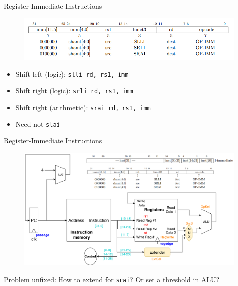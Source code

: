 \documentclass[UTF8]{ctexbeamer}
\begin{document}
\begin{frame}[fragile]{Register-Immediate Instructions}
\begin{figure}
\centering
\includegraphics[width=\linewidth]{fig/Lecture2/r-i_2.PNG}
\end{figure}
\begin{itemize}
	\item Shift left (logic): \verb'slli rd, rs1, imm'
	\item Shift right (logic): \verb'srli rd, rs1, imm'
	\item Shift right (arithmetic): \verb'srai rd, rs1, imm'
	\item Need not \verb'slai'
\end{itemize}
\end{frame}

\begin{frame}[fragile]{Register-Immediate Instructions}
\begin{figure}
\centering
\includegraphics[width=\linewidth]{fig/Lecture2/Datapath-R-I_2.pdf}
\end{figure}
Problem unfixed: How to extend for \verb'srai'? Or set a threshold in ALU?
\end{frame}
\end{document}

